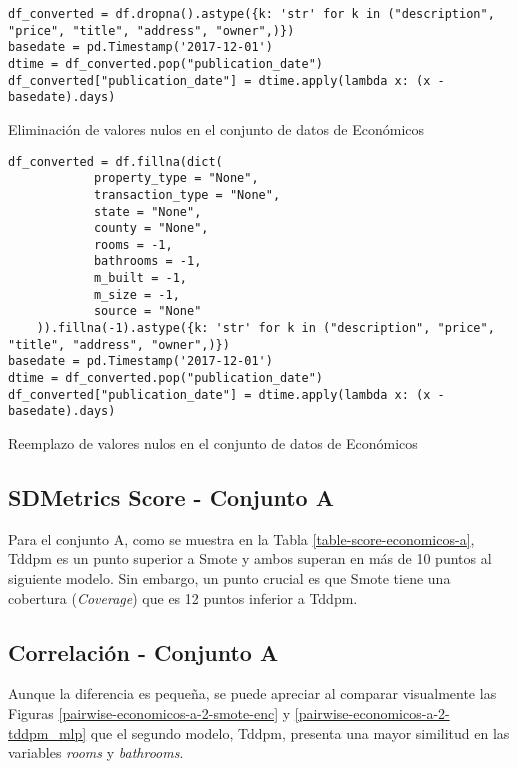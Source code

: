 \begin{listing}[H]
    \begin{verbatim}
df_converted = df.dropna().astype({k: 'str' for k in ("description", "price", "title", "address", "owner",)})
basedate = pd.Timestamp('2017-12-01')
dtime = df_converted.pop("publication_date")
df_converted["publication_date"] = dtime.apply(lambda x: (x - basedate).days)
    \end{verbatim}
\caption{Eliminación de valores nulos en el conjunto de datos de Económicos}
\label{codigo-remove-nan}
\end{listing}

\begin{listing}[H]
    \begin{verbatim}
df_converted = df.fillna(dict(
            property_type = "None",
            transaction_type = "None",
            state = "None",
            county = "None",
            rooms = -1,
            bathrooms = -1,
            m_built = -1,
            m_size = -1,
            source = "None"
    )).fillna(-1).astype({k: 'str' for k in ("description", "price", "title", "address", "owner",)})
basedate = pd.Timestamp('2017-12-01')
dtime = df_converted.pop("publication_date")
df_converted["publication_date"] = dtime.apply(lambda x: (x - basedate).days)
    \end{verbatim}
\caption{Reemplazo de valores nulos en el conjunto de datos de Económicos}
\label{codigo-replace-nan}
\end{listing}

\newpage
\subsection{SDMetrics Score - Conjunto A}
\label{ds-conjunto-a}
Para el conjunto A, como se muestra en la Tabla \ref{table-score-economicos-a}, Tddpm es un punto superior a Smote y ambos superan en más de 10 puntos al siguiente modelo. Sin embargo, un punto crucial es que Smote tiene una cobertura (\emph{Coverage}) que es 12 puntos inferior a Tddpm.



\newpage
\subsection{Correlación - Conjunto A}
\label{correlacion-conjunto-a}
Aunque la diferencia es pequeña, se puede apreciar al comparar visualmente las Figuras \ref{pairwise-economicos-a-2-smote-enc} y \ref{pairwise-economicos-a-2-tddpm_mlp} que el segundo modelo, Tddpm, presenta una mayor similitud en las variables \emph{rooms} y \emph{bathrooms}.




